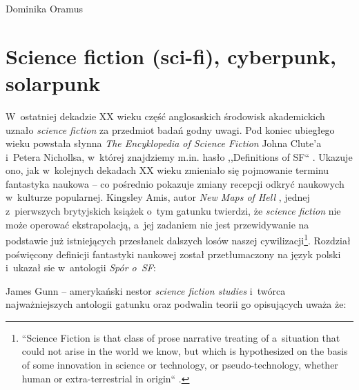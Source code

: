 \begin{artplenv}{Dominika Oramus}
\section*{Science fiction (sci-fi), cyberpunk, solarpunk}
W~ostatniej dekadzie XX wieku część anglosaskich środowisk akademickich uznało \textit{science fiction} za przedmiot badań godny uwagi. Pod koniec ubiegłego wieku powstała słynna \textit{The Encyklopedia of Science Fiction} Johna Clute’a i~Petera Nichollsa, w~której znajdziemy m.in. hasło ,,Definitions of SF``
\parencite[][s.~311–314]{clute_encyclopedia_1993}. %
 Ukazuje ono, jak w~kolejnych dekadach XX wieku zmieniało się pojmowanie terminu fantastyka naukowa -- co pośrednio pokazuje zmiany recepcji odkryć naukowych w~kulturze popularnej. Kingsley Amis, autor \textit{New Maps of Hell} 
\parencite*[][]{amis_new_1960}, %
 jednej z~pierwszych brytyjskich książek o~tym gatunku twierdzi, że \textit{science fiction} nie może operować ekstrapolacją, a~jej zadaniem nie jest przewidywanie na podstawie już istniejących przesłanek dalszych losów naszej cywilizacji\footnote{“Science Fiction is that class of prose narrative treating of a~situation that could not arise in the world we know, but which is hypothesized on the basis of some innovation in science or technology, or pseudo-technology, whether human or extra-terrestrial in origin`` 
\parencite[][s.~14]{amis_new_1960}.%
}. Rozdział poświęcony definicji fantastyki naukowej został przetłumaczony na język polski i~ukazał sie w~antologii \textit{Spór o~SF}:


James Gunn -- amerykański nestor \textit{science fiction studies} i~twórca najważniejszych antologii gatunku oraz podwalin teorii go opisujących uważa że:



\end{artplenv}
